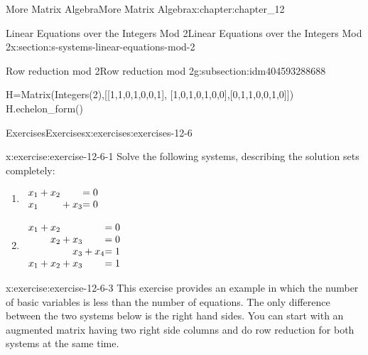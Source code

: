 \documentclass[twoside,10pt,]{book}
\numberwithin{equation}{section}
\begin{document}
\begin{chapterptx}{More Matrix Algebra}{}{More Matrix Algebra}{}{}{x:chapter:chapter_12}
\begin{sectionptx}{Linear Equations over the Integers Mod 2}{}{Linear Equations over the Integers Mod 2}{}{}{x:section:s-systems-linear-equations-mod-2}
\begin{subsectionptx}{Row reduction mod 2}{}{Row reduction mod 2}{}{}{g:subsection:idm404593288688}
\begin{sageinput}
H=Matrix(Integers(2),[[1,1,0,1,0,0,1],
   [1,0,1,0,1,0,0],[0,1,1,0,0,1,0]])
H.echelon_form()
\end{sageinput}
\begin{sageoutput}
[1 0 1 0 1 0 0]
[0 1 1 0 0 1 0]
[0 0 0 1 1 1 1]
\end{sageoutput}
\end{subsectionptx}
%
%
\typeout{************************************************}
\typeout{************************************************}
%
\begin{exercises-subsection}{Exercises}{}{Exercises}{}{}{x:exercises:exercises-12-6}
\begin{divisionexercise}{1}{}{}{x:exercise:exercise-12-6-1}%
Solve the following systems, describing the solution sets completely:%
\begin{enumerate}[label=(\alph*)]
\item{}\(\begin{array}{r@{}r@{}r@{}r@{}r@{}r@{}}
x_1  & {}+{} & x_2 &       &     & = 0 \\
x_1  &       &     & {}+{} & x_3 & = 0 \\
\end{array} \)%
\item{}\(\begin{array}{r@{}r@{}r@{}r@{}r@{}r@{}r@{}r@{}}
x_1  & {}+{} & x_2 &       &    &       &        & = 0 \\
&       & x_2 & {}+{} & x_3&       &       &   = 0\\
&       &     &       & x_3& {}+{} & x_4   & = 1 \\
x_1  & {}+{} & x_2 & {}+{} & x_3&       &        &  = 1 \\
\end{array} \)%
\end{enumerate}
%
\end{divisionexercise}%
\begin{divisionexercise}{2}{}{}{x:exercise:exercise-12-6-3}%
This exercise provides an example in which the number of basic variables is less than the number of equations. The only difference between the two systems below is the right hand sides.  You can start with an augmented matrix having two right side columns and do row reduction for both systems at the same time.%
\begin{multicols}{2}
\end{multicols}
\end{divisionexercise}
\end{exercises-subsection}
\end{sectionptx}
\end{chapterptx}
\end{document}
